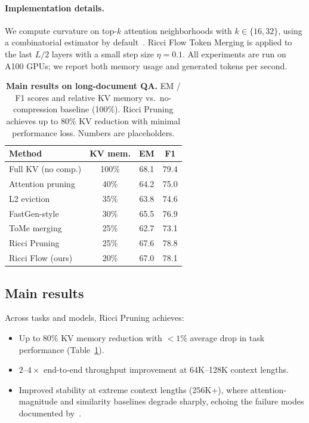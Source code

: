 \documentclass{article}
\theoremstyle{plain}
\theoremstyle{definition}
\theoremstyle{remark}
\begin{document}
\paragraph{Implementation details.}
We compute curvature on top-$k$ attention neighborhoods with $k\in\{16,32\}$, using a combinatorial estimator by default~\citep{forman2003bochner,weber2024discrete}. Ricci Flow Token Merging is applied to the last $L/2$ layers with a small step size $\eta=0.1$. All experiments are run on A100 GPUs; we report both memory usage and generated tokens per second.

\begin{table}[t]
  \centering
  \caption{\textbf{Main results on long-document QA.} EM / F1 scores and relative KV memory vs.\ no-compression baseline (100\%). Ricci Pruning achieves up to 80\% KV reduction with minimal performance loss. Numbers are placeholders.}
  \label{tab:main-results}
  \begin{tabular}{lccc}
    \toprule
    Method & KV mem. & EM & F1 \\
    \midrule
    Full KV (no comp.) & 100\% & 68.1 & 79.4 \\
    Attention pruning  & 40\%  & 64.2 & 75.0 \\
    L2 eviction        & 35\%  & 63.8 & 74.6 \\
    FastGen-style      & 30\%  & 65.5 & 76.9 \\
    ToMe merging       & 25\%  & 62.7 & 73.1 \\
    \midrule
    Ricci Pruning      & 25\%  & 67.6 & 78.8 \\
    Ricci Flow (ours)  & 20\%  & 67.0 & 78.1 \\
    \bottomrule
  \end{tabular}
\end{table}

\subsection{Main results}

Across tasks and models, Ricci Pruning achieves:
\begin{itemize}
  \item Up to $80\%$ KV memory reduction with $<1\%$ average drop in task performance (Table~\ref{tab:main-results}).
  \item $2$--$4\times$ end-to-end throughput improvement at 64K--128K context lengths.
  \item Improved stability at extreme context lengths (256K+), where attention-magnitude and similarity baselines degrade sharply, echoing the failure modes documented by~\citet{liu2024lost}.
\end{itemize}
\end{document}

